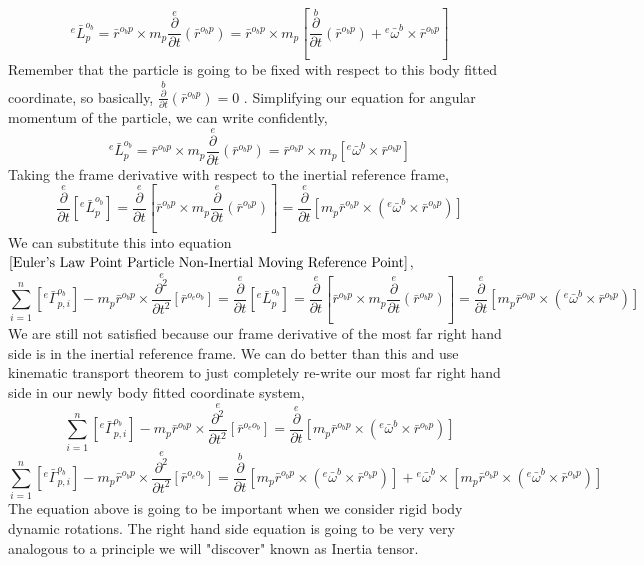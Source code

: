 $${}^{e}\bar{L}^{o_{b}}_{p} = \bar{r}^{o_{b}p}\times m_{p}\overset{e}{\frac{\partial}{\partial t}}\left(\bar{r}^{o_{b}p}\right) = \bar{r}^{o_{b}p}\times m_{p}\left[
\overset{b}{\frac{\partial}{\partial t}}\left(\bar{r}^{o_{b}p}\right) + {}^{e}\bar{\omega}^{b}\times\bar{r}^{o_{b}p}\right]$$
Remember that the particle is going to be fixed with respect to this body fitted coordinate, so basically, $\displaystyle \overset{b}{\frac{\partial}{\partial t}}\left(\bar{r}^{o_{b}p}\right) = 0$ .
Simplifying our equation for angular momentum of the particle, we can write confidently,
$${}^{e}\bar{L}^{o_{b}}_{p} = \bar{r}^{o_{b}p}\times m_{p}\overset{e}{\frac{\partial}{\partial t}}\left(\bar{r}^{o_{b}p}\right) = \bar{r}^{o_{b}p}\times m_{p}\left[{}^{e}\bar{\omega}^{b}\times\bar{r}^{o_{b}p}\right]$$
Taking the frame derivative with respect to the inertial reference frame,
$$\overset{e}{\frac{\partial}{\partial t}}\left[{}^{e}\bar{L}^{o_{b}}_{p}\right] = \overset{e}{\frac{\partial}{\partial t}}\left[\bar{r}^{o_{b}p}\times m_{p}\overset{e}{\frac{\partial}{\partial t}}\left(\bar{r}^{o_{b}p}\right)\right] = \overset{e}{\frac{\partial}{\partial t}}\left[m_{p}\bar{r}^{o_{b}p}\times\left({}^{e}\bar{\omega}^{b}\times\bar{r}^{o_{b}p}\right)\right]$$
We can substitute this into equation $\ref{Euler's Law Point Particle Non-Inertial Moving Reference Point}$,
$$\sum^{n}_{i = 1}\left[{}^{e}\bar{\Gamma}^{o_{b}}_{p,i}\right] - m_{p}\bar{r}^{o_{b}p}\times\overset{e}{\frac{\partial^{2}}{\partial t^{2}}}[\bar{r}^{o_{e}o_{b}}] = \overset{e}{\frac{\partial}{\partial t}}\left[{}^{e}\bar{L}^{o_{b}}_{p}\right] = \overset{e}{\frac{\partial}{\partial t}}\left[\bar{r}^{o_{b}p}\times m_{p}\overset{e}{\frac{\partial}{\partial t}}\left(\bar{r}^{o_{b}p}\right)\right] = \overset{e}{\frac{\partial}{\partial t}}\left[m_{p}\bar{r}^{o_{b}p}\times\left({}^{e}\bar{\omega}^{b}\times\bar{r}^{o_{b}p}\right)\right]$$
We are still not satisfied because our frame derivative of the most far right hand side is in the inertial reference frame.
We can do better than this and use kinematic transport theorem to just completely re-write our most far right hand side in our newly body fitted coordinate system,
$$\sum^{n}_{i = 1}\left[{}^{e}\bar{\Gamma}^{o_{b}}_{p,i}\right] - m_{p}\bar{r}^{o_{b}p}\times\overset{e}{\frac{\partial^{2}}{\partial t^{2}}}[\bar{r}^{o_{e}o_{b}}] = \overset{e}{\frac{\partial}{\partial t}}\left[m_{p}\bar{r}^{o_{b}p}\times\left({}^{e}\bar{\omega}^{b}\times\bar{r}^{o_{b}p}\right)\right]$$
\begin{equation}
\sum^{n}_{i = 1}\left[{}^{e}\bar{\Gamma}^{o_{b}}_{p,i}\right] - m_{p}\bar{r}^{o_{b}p}\times\overset{e}{\frac{\partial^{2}}{\partial t^{2}}}[\bar{r}^{o_{e}o_{b}}] = 
\overset{b}{\frac{\partial}{\partial t}}\left[m_{p}\bar{r}^{o_{b}p}\times\left({}^{e}\bar{\omega}^{b}\times\bar{r}^{o_{b}p}\right)\right] + {}^{e}\bar{\omega}^{b}\times\left[m_{p}\bar{r}^{o_{b}p}\times\left({}^{e}\bar{\omega}^{b}\times\bar{r}^{o_{b}p}\right)\right]
\label{Euler's Law Point Particle Non-Inertial Body-fitted Coordinate System}
\end{equation}
The equation above is going to be important when we consider rigid body dynamic rotations. 
The right hand side equation is going to be very very analogous to a principle we will "discover" known as Inertia tensor.


